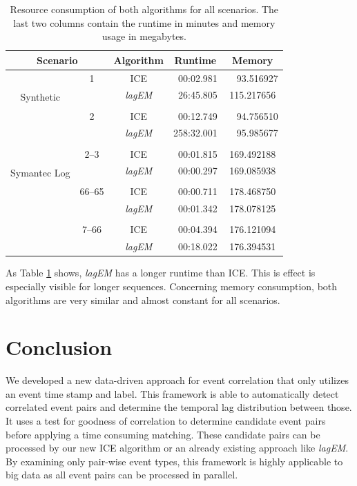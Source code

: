 \documentclass[conference]{IEEEtran}
\theoremstyle{examplestyle}
\begin{document}
\begin{table}[!tb]
	\centering
	\caption{Resource consumption of both algorithms for all scenarios. The last two columns contain the runtime in minutes and memory usage in megabytes.}
	\label{tbl:resources}
	\begin{tabular}{c c c c c}
		\multicolumn{2}{c}{\textbf{Scenario}} & \textbf{Algorithm} & \textbf{Runtime} & \textbf{Memory} \\
		\hline
		\multirow{4}{2mm}{\begin{sideways} Synthetic \hspace{1mm} \end{sideways}} & 1	& \ac{ICE}				&	~00:02.981	&	~~93.516927	\\
			& & \textit{lagEM}		&	~26:45.805	&	115.217656	\\
		\\[-1ex]
		&2	& \ac{ICE}				&	~00:12.749	&	~~94.756510	\\
		&	& \textit{lagEM}		&	258:32.001	&	~~95.985677	\\
		\hline
		\\[-1ex]
		\multirow{4}{2mm}{\begin{sideways} Symantec Log \hspace{2mm} \end{sideways}} &2--3 & \ac{ICE}				&	~00:01.815	&	169.492188 \\
		&	&	\textit{lagEM}		&	~00:00.297	&	169.085938 \\[-1ex]
		\\
		&66--65 & \ac{ICE}			&	~00:00.711	&	178.468750 \\
		&	&	\textit{lagEM}		&	~00:01.342	&	178.078125 \\[-1ex]
		\\
		&7--66 & \ac{ICE}			&	~00:04.394	&	176.121094 \\
		&	&	\textit{lagEM}		&	~00:18.022	&	176.394531
	\end{tabular}

\end{table}



As Table \ref{tbl:resources} shows, \textit{lagEM} has a longer runtime than \ac{ICE}. This is effect is especially visible for longer sequences. Concerning memory consumption, both algorithms are very similar and almost constant for all scenarios.



\section{Conclusion} \label{sec:conc}
We developed a new data-driven approach for event correlation that only utilizes an event time stamp and label. This framework is able to automatically detect correlated event pairs and determine the temporal lag distribution between those. It uses a test for goodness of correlation to determine candidate event pairs before applying a time consuming matching. These candidate pairs can be processed by our new \ac{ICE} algorithm or an already existing approach like \textit{lagEM}. By examining only pair-wise event types, this framework is highly applicable to big data as all event pairs can be processed in parallel.
\end{document}
